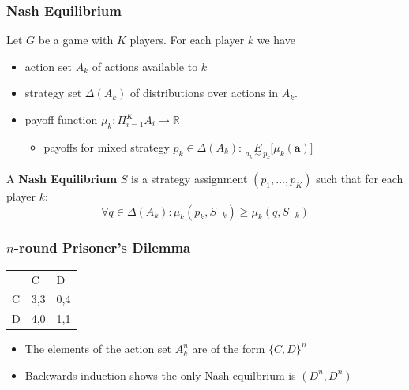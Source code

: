\documentclass{beamer}
\begin{document}
\begin{frame}
	
\end{frame}

\begin{frame}
	\frametitle{Nash Equilibrium}
	Let $G$ be a game with $K$ players. For each player $k$ we have
	\begin{itemize}
		\item action set $A_k$ of actions available to $k$
		\item strategy set $\Delta(A_k)$ of distributions over actions in $A_k$.
		\item payoff function $\mu_k: \Pi_{i=1}^K A_i \longrightarrow \mathbb{R}$
		\begin{itemize}
			\item payoffs for mixed strategy $p_k \in \Delta(A_k)$: $\underset{a_k \sim p_k}{E}\lbrack \mu_k(\textbf{a}) \rbrack$
		\end{itemize}
	\end{itemize}
	
	A \textbf{Nash Equilibrium} $S$ is a strategy assignment $(p_1,..., p_K)$ such that for each player $k$:
	\begin{equation}
	\forall q \in \Delta(A_k): \mu_k(p_k, S_{-k}) \ge \mu_k(q, S_{-k})
	\end{equation}
	
\end{frame}

\begin{frame}
	\frametitle{$n$-round Prisoner's Dilemma}
	\begin{table}[H]
		\centering
		\label{pdpayoffs}
		\begin{tabular}{lll}
			& C                        & D                        \\ \cline{2-3} 
			\multicolumn{1}{l|}{C} & \multicolumn{1}{l|}{3,3} & \multicolumn{1}{l|}{0,4} \\ \cline{2-3} 
			\multicolumn{1}{l|}{D} & \multicolumn{1}{l|}{4,0} & \multicolumn{1}{l|}{1,1} \\ \cline{2-3} 
		\end{tabular}
	\end{table}
	
	\begin{itemize}
		\item The elements of the action set $A^n_k$ are of the form $\lbrace C,D \rbrace^n$
		\item Backwards induction shows the only Nash equilbrium is $(D^n, D^n)$
	\end{itemize}
	
	
\end{frame}
\end{document}
